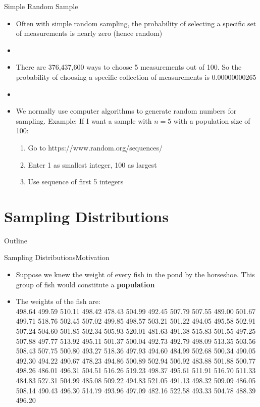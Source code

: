 \documentclass[xcolor=dvipsnames]{beamer}
\begin{document}
\begin{frame}{Simple Random Sample}
	\begin{itemize}
		\item Often with simple random sampling, the probability of selecting a specific set of measurements is nearly zero (hence random)  \pause 
		\item[]
		\item There are 376,437,600 ways to choose 5 measurements out of 100. So the probability of choosing a specific collection of measurements is 0.00000000265 \pause 
		\item[]
		\item We normally use computer algorithms to generate random numbers for sampling. Example: If I want a sample with $n=5$ with a population size of 100: \pause 
		\begin{enumerate}
			\item Go to https://www.random.org/sequences/ \pause 
			\item Enter 1 as smallest integer, 100 as largest \pause 
			\item Use sequence of first 5 integers
		\end{enumerate}
	\end{itemize}
\end{frame}

\section{Sampling Distributions}
\begin{frame}{Outline}
	\tableofcontents[currentsection,subsectionstyle=show/shaded/hide]
\end{frame}

\begin{frame}{Sampling Distributions}{Motivation}
	\begin{itemize}
		\item Suppose we knew the weight of every fish in the pond by the horseshoe. This group of fish would constitute a \textbf{population} \pause 
		\item The weights of the fish are: \\
		498.64 499.59 510.11 498.42 478.43 504.99 492.45 507.79 507.55 489.00 501.67 499.71 518.76 502.45 507.02 499.85
		498.57 503.21 501.22 494.05 495.58 502.91 507.24 504.60 501.85 502.34 505.93 520.01 481.63 491.38 515.83 501.55
		497.25 507.88 497.77 513.92 495.11 501.37 500.04 492.73 492.79 498.09 513.35 503.56 508.43 507.75 500.80 493.27
		518.36 497.93 494.60 484.99 502.68 500.34 490.05 492.30 494.22 490.67 478.23 494.86 500.89 502.94 506.92 483.88
		501.88 500.77 498.26 486.01 496.31 504.51 516.26 519.23 498.37 495.61 511.91 516.70 511.33 484.83 527.31 504.99
		485.08 509.22 494.83 521.05 491.13 498.32 509.09 486.05 508.14 490.43 496.30 514.79 493.96 497.09 482.16 522.58
		493.33 504.78 488.39 496.20
	\end{itemize}
\end{frame}
\end{document}

